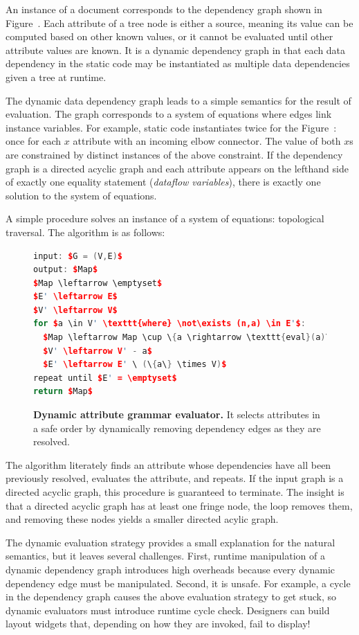 An instance of a document corresponds to the dependency graph shown in Figure~. Each attribute of a tree node is either a source, meaning its value can be computed based on other known values, or it cannot be evaluated until other attribute values are known. It is a dynamic dependency graph in that each data dependency in the static code may be instantiated as multiple data dependencies given a tree at runtime. 

The dynamic data dependency graph leads to a simple semantics for the result of evaluation. The graph corresponds to a system of equations where edges link instance variables. For example, static code  instantiates twice for the Figure~: once for each $x$ attribute with an incoming elbow connector. The value of both $x$s are constrained by distinct instances of the above constraint. If the dependency graph is a directed acyclic graph and each attribute appears on the lefthand side of exactly one equality statement (\emph{dataflow variables}), there is exactly one solution to the system of equations.

A simple procedure solves an instance of a system of equations: topological traversal. The algorithm is as follows:
\begin{figure}
\begin{lstlisting}[mathescape,language=C++,morekeywords={for,in,where,input,output,repeat,until,return}]
input: $G = (V,E)$
output: $Map$
$Map \leftarrow \emptyset$
$E' \leftarrow E$
$V' \leftarrow V$
for $a \in V' \texttt{where} \not\exists (n,a) \in E'$:
  $Map \leftarrow Map \cup \{a \rightarrow \texttt{eval}(a)\}$
  $V' \leftarrow V' - a$
  $E' \leftarrow E' \ (\{a\} \times V)$
repeat until $E' = \emptyset$
return $Map$
\end{lstlisting}
\caption{\textbf{Dynamic attribute grammar evaluator.} It selects attributes in a safe order by dynamically removing dependency edges as they are resolved. }
\label{fig:dyneval}
\end{figure}
The algorithm literately finds an attribute whose dependencies have all been previously resolved, evaluates the attribute, and repeats. If the input graph is a directed acyclic graph, this procedure is guaranteed to terminate. The insight is that a directed acyclic graph has at least one fringe node, the loop removes them, and removing these nodes yields a smaller directed acylic graph.

The dynamic evaluation strategy provides a small explanation for the natural semantics, but it leaves several challenges. First, runtime manipulation of a dynamic dependency graph introduces high overheads because every dynamic dependency edge must be manipulated. Second, it is unsafe. For example, a cycle in the dependency graph causes the above evaluation strategy to get stuck, so dynamic evaluators must introduce runtime cycle check. Designers can build layout widgets that, depending on how they are invoked, fail to display!

